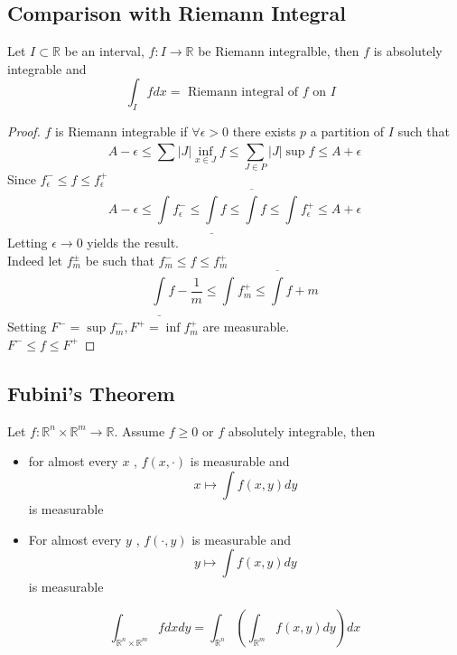 \documentclass[../main.tex]{subfiles}
\begin{document}
\subsection{Comparison with Riemann Integral}
\begin{thm}
	Let $I \subset \mathbb{R}$ be an interval, $f: I \to \mathbb{R}$ be Riemann integralble, then $f$ is absolutely integrable and
	\[ 
	\int_{ I }^{  }f dx = \text{ Riemann integral of $f$ on $I$  } 
	\]
		
\end{thm}
\begin{proof}
$f$ is Riemann integrable if $\forall \epsilon>0$ there exists $p$ a partition of $I$ such that 
\[ 
A- \epsilon \leq \sum_{}^{ } |J| \inf_{x\in J} f \leq  \sum_{J\in P}^{ } |J| \sup f \leq A + \epsilon
\]
Since $f_\epsilon^{-} \leq f \leq  f_\epsilon^{+}$ 
\[ 
	A-\epsilon \leq \int_{  }^{  } f_\epsilon^{-} \leq  \underline{\int} f \leq  \overline{\int} f \leq  \int_{  }^{  }f_\epsilon^{+} \leq A+\epsilon
\]
Letting $\epsilon \to 0$ yields the result.\\
Indeed let $f_m^{\pm}$ be such that $f_m^{-} \leq  f \leq f_m^{+}$ 
\[ 
\underline{ \int }_{  }^{  }f-\frac{1}{m} \leq  \int_{  }^{  } f_m^{+ } \leq \overline { \int} f + m
\]
Setting $F^{-}= \sup f_m^{-}, F^{+}= \inf f_m^{+}$ are measurable.\\
$F^{-} \leq  f \leq F^{+}$ 

			
\end{proof}
\subsection{Fubini's Theorem}
\begin{thm}
Let $f: \mathbb{R}^n\times \mathbb{R}^m\to \mathbb{R}$. Assume $f \geq 0$ or $f$ absolutely integrable, then
\begin{itemize}
\item for almost every $x$ , $f( x, \cdot) $ is measurable and
	\[ 
	x\mapsto \int f( x,y) dy
	\]
	is measurable
\item For almost every $y$ , $f( \cdot, y) $ is measurable and
	\[ 
	y\mapsto \int f( x,y) dy
	\]
	is measurable
\end{itemize}

\[ 
\int_{ \mathbb{R}^n\times \mathbb{R}^m }^{  } f dx dy = \int_{ \mathbb{R}^n }^{  } \left( \int_{ \mathbb{R}^m }^{  } f( x,y) dy  \right)dx
\]

\end{thm}
\end{document}

